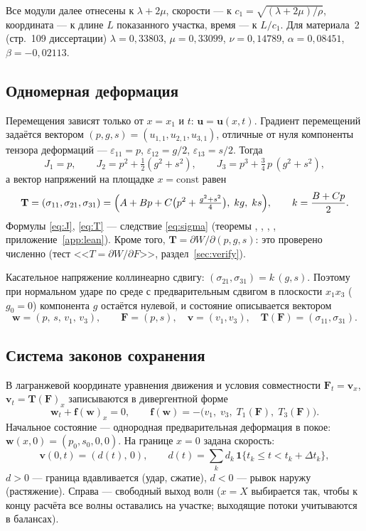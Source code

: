\documentclass[11pt,a4paper]{article}
\theoremstyle{definition}
\theoremstyle{remark}
\newcommand{\bw}{\mathbf w}
\newcommand{\bF}{\mathbf F}
\newcommand{\bv}{\mathbf v}
\newcommand{\bT}{\mathbf T}
\newcommand{\lean}[1]{\texttt{\detokenize{#1}}}
\begin{document}
Все модули далее отнесены к $\lambda+2\mu$, скорости --- к $c_1=\sqrt{(\lambda+2\mu)/\rho}$,
координата --- к длине $L$ показанного участка, время --- к $L/c_1$.
Для материала~2 (стр.~109 диссертации) $\lambda=0{,}33803$, $\mu=0{,}33099$, $\nu=0{,}14789$,
$\alpha=0{,}08451$, $\beta=-0{,}02113$.

\subsection{Одномерная деформация}
Перемещения зависят только от $x=x_1$ и $t$: $\mathbf u = \mathbf u(x,t)$. Градиент перемещений
задаётся вектором $(p,g,s) = (u_{1,1}, u_{2,1}, u_{3,1})$, отличные от нуля компоненты тензора
деформаций --- $\varepsilon_{11}=p$, $\varepsilon_{12}=g/2$, $\varepsilon_{13}=s/2$. Тогда
\begin{equation}\label{eq:J}
J_1 = p,\qquad J_2 = p^2+\tfrac12(g^2+s^2),\qquad J_3 = p^3 + \tfrac34\,p\,(g^2+s^2),
\end{equation}
а вектор напряжений на площадке $x=\mathrm{const}$ равен
\begin{equation}\label{eq:T}
\bT = (\sigma_{11},\sigma_{21},\sigma_{31}) = \Bigl(A + Bp + C\bigl(p^2+\tfrac{g^2+s^2}{4}\bigr),\; k g,\; k s\Bigr),\qquad k=\frac{B+Cp}{2}.
\end{equation}
Формулы \eqref{eq:J}, \eqref{eq:T} --- следствие \eqref{eq:sigma} (теоремы \lean{J1_eq}, \lean{J2_eq},
\lean{J3_eq}, \lean{traction_eq}, приложение~\ref{app:lean}). Кроме того, $\bT = \partial W/\partial(p,g,s)$:
это проверено численно (тест <<$T=\partial W/\partial F$>>, раздел~\ref{sec:verify}).

Касательное напряжение коллинеарно сдвигу: $(\sigma_{21},\sigma_{31}) = k\,(g,s)$. Поэтому при
нормальном ударе по среде с предварительным сдвигом в плоскости $x_1x_3$ ($g_0=0$) компонента $g$
остаётся нулевой, и состояние описывается вектором
\[
\bw = (p,\,s,\,v_1,\,v_3),\qquad \bF=(p,s),\quad \bv=(v_1,v_3),\quad \bT(\bF)=(\sigma_{11},\sigma_{31}).
\]

\subsection{Система законов сохранения}
В лагранжевой координате уравнения движения и условия совместности $\bF_t = \bv_x$,
$\bv_t = \bT(\bF)_x$ записываются в дивергентной форме
\begin{equation}\label{eq:cons}
\bw_t + \mathbf f(\bw)_x = 0,\qquad \mathbf f(\bw) = -\bigl(v_1,\;v_3,\;T_1(\bF),\;T_3(\bF)\bigr).
\end{equation}
Начальное состояние --- однородная предварительная деформация в покое:
$\bw(x,0) = (p_0, s_0, 0, 0)$. На границе $x=0$ задана скорость:
\begin{equation}\label{eq:bc}
\bv(0,t) = (d(t),\,0),\qquad d(t) = \sum_k d_k\,\mathbf 1\{t_k\le t<t_k+\Delta t_k\},
\end{equation}
$d>0$ --- граница вдавливается (удар, сжатие), $d<0$ --- рывок наружу (растяжение).
Справа --- свободный выход волн ($x=X$ выбирается так, чтобы к концу расчёта все волны
оставались на участке; выходящие потоки учитываются в балансах).
\end{document}
